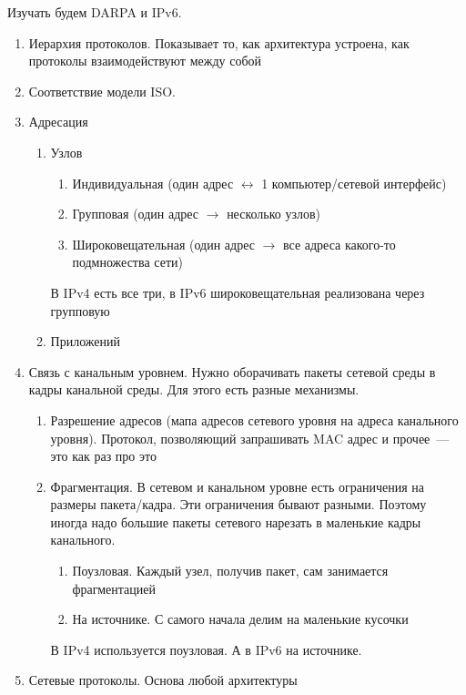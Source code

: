 Изучать будем DARPA и IPv6. 


\begin{enumerate}
    \item Иерархия протоколов. Показывает то, как архитектура устроена, как протоколы взаимодействуют между собой
    \item Соответствие модели ISO. 
    \item Адресация
    \begin{enumerate}
        \item Узлов
        \begin{enumerate}
            \item Индивидуальная (один адрес $\leftrightarrow$ 1 компьютер/сетевой интерфейс)
            \item Групповая (один адрес $\rightarrow$ несколько узлов)
            \item Широковещательная (один адрес $\rightarrow$ все адреса какого-то подмножества сети)
        \end{enumerate}
        В IPv4 есть все три, в IPv6 широковещательная реализована через групповую
        \item Приложений
    \end{enumerate}
    \item Связь с канальным уровнем. Нужно оборачивать пакеты сетевой среды в кадры канальной среды. Для этого есть разные механизмы.
    \begin{enumerate}
        \item Разрешение адресов (мапа адресов сетевого уровня на адреса канального уровня). Протокол, позволяющий запрашивать MAC адрес и прочее~--- это как раз про это
        \item Фрагментация. В сетевом и канальном уровне есть ограничения на размеры пакета/кадра. Эти ограничения бывают разными. Поэтому иногда надо большие пакеты сетевого нарезать в маленькие кадры канального.
        \begin{enumerate}
            \item Поузловая. Каждый узел, получив пакет, сам занимается фрагментацией
            \item На источнике. С самого начала делим на маленькие кусочки
        \end{enumerate}
        В IPv4 используется поузловая. А в IPv6 на источнике.  
    \end{enumerate}
    \item Сетевые протоколы. Основа любой архитектуры

\end{enumerate}
